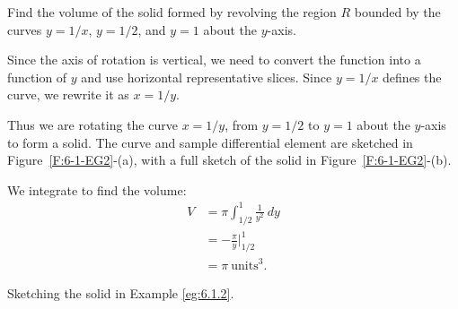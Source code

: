 \begin{example} \label{eg:6.1.2} %
Find the volume of the solid formed by revolving the region $R$ bounded by the curves $y=1/x$, $y=1/2$, and $y=1$ about the $y$-axis.

\solution Since the axis of rotation is vertical, we need to convert the function into a function of $y$ and use horizontal representative slices. Since $y=1/x$ defines the curve, we rewrite it as $x=1/y$. %

Thus we are rotating the curve $x=1/y$, from $y=1/2$ to $y=1$ about the $y$-axis to form a solid. The curve and sample differential element are sketched in Figure~\ref{F:6-1-EG2}-(a), with a full sketch of the solid in Figure~\ref{F:6-1-EG2}-(b).

We integrate to find the volume:
\begin{align*}
V &= \pi\int_{1/2}^1 \frac{1}{y^2}\ dy \\
	&= -\frac{\pi}y\Big|_{1/2}^1 \\
	&= \pi\ \text{units}^3.
\end{align*}		
\end{example}

\begin{marginfigure}[0cm] %

\caption{Sketching the solid in Example \ref{eg:6.1.2}.}
\label{F:6-1-EG2}
\end{marginfigure}